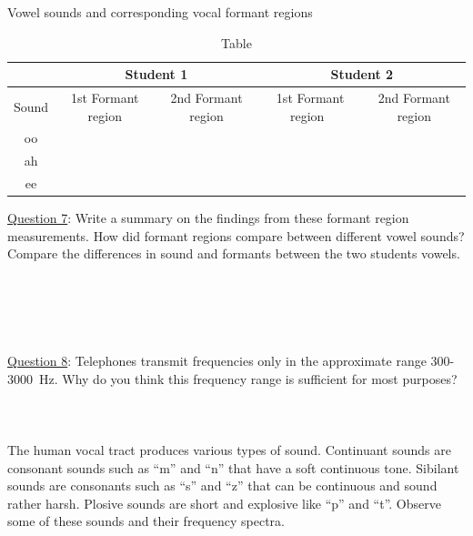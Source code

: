 \documentclass[11pt]{NSF}
\begin{document}
\begin{table}[hbtp]
\begin{center}
Vowel sounds and corresponding vocal formant regions\\
\begin{tabular}{| c | c | c | c | c | }
\hline
&\multicolumn{2}{c}{Student 1} \vrule
&\multicolumn{2}{c}{Student 2} \vrule\\
\hline
Sound & \phantom{ }1st Formant region \phantom{ } & 2nd Formant region & \phantom{ }1st Formant region\phantom{ }\  & 2nd Formant region\\
\hline
oo &  &  &  &  \\
\hline
ah  &  &  &  &  \\
\hline
ee  &  &  &  &  \\
\hline
\end{tabular}
\caption{Table}
\label{t:1}
\end{center}
\end{table}

\underline{Question 7}:  
Write a summary on the findings from these formant region measurements. 
How did formant regions compare between different vowel sounds? 
Compare the differences in sound and formants between the two students vowels.
\\
\\
\\
\\
\\
\\

\underline{Question 8}: 
Telephones transmit frequencies only in the approximate range
300-3000~Hz. Why do you think this frequency range is 
sufficient for most purposes? \\
\\
\\
\\

The human vocal tract produces various types of sound. Continuant sounds are consonant sounds
such as “m” and “n” that have a soft continuous tone. Sibilant sounds are consonants such as “s”
and “z” that can be continuous and sound rather harsh. Plosive sounds are short and explosive
like “p” and “t”. Observe some of these sounds and their frequency spectra.
\end{document}

